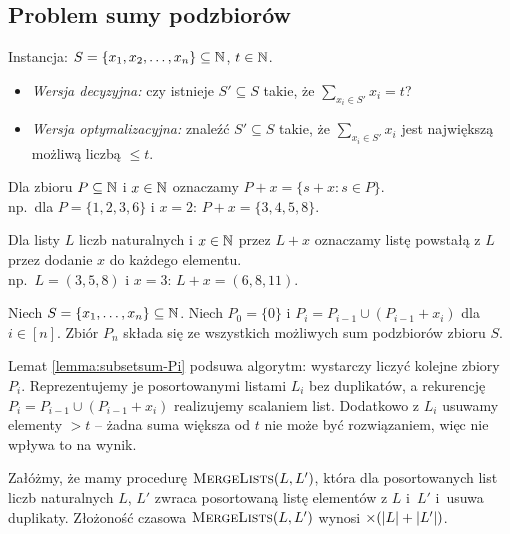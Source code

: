 \subsection{Problem sumy podzbiorów}

\begin{problem} \label{problem:subsetsum}
	Instancja: $S = \{x_1, x_2, \ldots, x_n\} \subseteq \mathbb{N}$, $t \in \mathbb{N}$.
	\begin{itemize}[nosep]
		\item \emph{Wersja decyzyjna:} czy istnieje $S' \subseteq S$ takie, że $\sum_{x_i \in S'} x_i = t$?
		\item \emph{Wersja optymalizacyjna:} znaleźć $S' \subseteq S$ takie, że $\sum_{x_i \in S'} x_i$ jest największą możliwą liczbą $\leq t$.
	\end{itemize}
\end{problem}

Dla zbioru $P \subseteq \mathbb{N}$ i $x \in \mathbb{N}$ oznaczamy $P + x = \{s + x : s \in P\}$.\\
np.\ dla $P = \{1, 2, 3, 6\}$ i $x = 2$: \quad $P + x = \{3, 4, 5, 8\}$.

Dla listy $L$ liczb naturalnych i $x \in \mathbb{N}$ przez $L + x$ oznaczamy listę powstałą z $L$ przez dodanie $x$ do każdego elementu.\\
np.\ $L = (3, 5, 8)$ i $x = 3$: \quad $L + x = (6, 8, 11)$.

\begin{lemma} \label{lemma:subsetsum-Pi}
	Niech $S = \{x_1, \ldots, x_n\} \subseteq \mathbb{N}$. Niech $P_0 = \{0\}$ i $P_i = P_{i-1} \cup (P_{i-1} + x_i)$ dla $i \in [n]$. Zbiór $P_n$ składa się ze wszystkich możliwych sum podzbiorów zbioru $S$.
\end{lemma}
Lemat \ref{lemma:subsetsum-Pi} podsuwa algorytm: wystarczy liczyć kolejne zbiory $P_i$. Reprezentujemy je posortowanymi listami $L_i$ bez duplikatów, a rekurencję $P_i = P_{i-1} \cup (P_{i-1} + x_i)$ realizujemy scalaniem list. Dodatkowo z $L_i$ usuwamy elementy $> t$ -- żadna suma większa od $t$ nie może być rozwiązaniem, więc nie wpływa to na wynik.

Załóżmy, że mamy procedurę $\Call{MergeLists}{L, L'}$, która dla posortowanych list liczb naturalnych $L$, $L'$ zwraca posortowaną listę elementów z $L$ i~$L'$ i~usuwa duplikaty. Złożoność czasowa $\Call{MergeLists}{L, L'}$ wynosi $\mathcal{\Theta}(|L| + |L'|)$.

